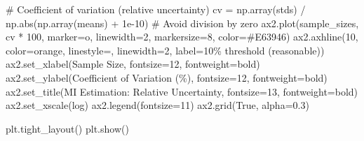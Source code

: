 \documentclass[
  11pt,
  letterpaper,
  oneside,
  openany]{book}
\newenvironment{Shaded}{\begin{snugshade}}{\end{snugshade}}
\newcommand{\BuiltInTok}[1]{\textcolor[rgb]{0.00,0.23,0.31}{#1}}
\newcommand{\CommentTok}[1]{\textcolor[rgb]{0.37,0.37,0.37}{#1}}
\newcommand{\DecValTok}[1]{\textcolor[rgb]{0.68,0.00,0.00}{#1}}
\newcommand{\FloatTok}[1]{\textcolor[rgb]{0.68,0.00,0.00}{#1}}
\newcommand{\NormalTok}[1]{\textcolor[rgb]{0.00,0.23,0.31}{#1}}
\newcommand{\OperatorTok}[1]{\textcolor[rgb]{0.37,0.37,0.37}{#1}}
\newcommand{\StringTok}[1]{\textcolor[rgb]{0.13,0.47,0.30}{#1}}
\newcommand{\VariableTok}[1]{\textcolor[rgb]{0.07,0.07,0.07}{#1}}
\begin{document}
\begin{Shaded}
\begin{Highlighting}[]
\CommentTok{\# Coefficient of variation (relative uncertainty)}
\NormalTok{cv }\OperatorTok{=}\NormalTok{ np.array(stds) }\OperatorTok{/}\NormalTok{ np.}\BuiltInTok{abs}\NormalTok{(np.array(means) }\OperatorTok{+} \FloatTok{1e{-}10}\NormalTok{)  }\CommentTok{\# Avoid division by zero}
\NormalTok{ax2.plot(sample\_sizes, cv }\OperatorTok{*} \DecValTok{100}\NormalTok{, marker}\OperatorTok{=}\StringTok{\textquotesingle{}o\textquotesingle{}}\NormalTok{, linewidth}\OperatorTok{=}\DecValTok{2}\NormalTok{, markersize}\OperatorTok{=}\DecValTok{8}\NormalTok{, color}\OperatorTok{=}\StringTok{\textquotesingle{}\#E63946\textquotesingle{}}\NormalTok{)}
\NormalTok{ax2.axhline(}\DecValTok{10}\NormalTok{, color}\OperatorTok{=}\StringTok{\textquotesingle{}orange\textquotesingle{}}\NormalTok{, linestyle}\OperatorTok{=}\StringTok{\textquotesingle{}{-}{-}\textquotesingle{}}\NormalTok{, linewidth}\OperatorTok{=}\DecValTok{2}\NormalTok{, }
\NormalTok{            label}\OperatorTok{=}\StringTok{\textquotesingle{}10\% threshold (reasonable)\textquotesingle{}}\NormalTok{)}
\NormalTok{ax2.set\_xlabel(}\StringTok{\textquotesingle{}Sample Size\textquotesingle{}}\NormalTok{, fontsize}\OperatorTok{=}\DecValTok{12}\NormalTok{, fontweight}\OperatorTok{=}\StringTok{\textquotesingle{}bold\textquotesingle{}}\NormalTok{)}
\NormalTok{ax2.set\_ylabel(}\StringTok{\textquotesingle{}Coefficient of Variation (\%)\textquotesingle{}}\NormalTok{, fontsize}\OperatorTok{=}\DecValTok{12}\NormalTok{, fontweight}\OperatorTok{=}\StringTok{\textquotesingle{}bold\textquotesingle{}}\NormalTok{)}
\NormalTok{ax2.set\_title(}\StringTok{\textquotesingle{}MI Estimation: Relative Uncertainty\textquotesingle{}}\NormalTok{, fontsize}\OperatorTok{=}\DecValTok{13}\NormalTok{, fontweight}\OperatorTok{=}\StringTok{\textquotesingle{}bold\textquotesingle{}}\NormalTok{)}
\NormalTok{ax2.set\_xscale(}\StringTok{\textquotesingle{}log\textquotesingle{}}\NormalTok{)}
\NormalTok{ax2.legend(fontsize}\OperatorTok{=}\DecValTok{11}\NormalTok{)}
\NormalTok{ax2.grid(}\VariableTok{True}\NormalTok{, alpha}\OperatorTok{=}\FloatTok{0.3}\NormalTok{)}

\NormalTok{plt.tight\_layout()}
\NormalTok{plt.show()}


\end{Highlighting}
\end{Shaded}
\end{document}
